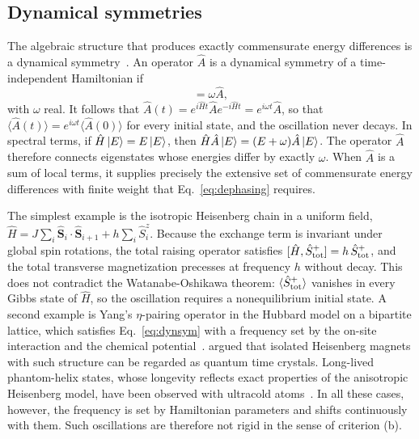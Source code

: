 \documentclass[%
reprint,
superscriptaddress,
amsmath,amssymb,
aps,
prb,
showkeys,%
floatfix,
]{revtex4-2}
\let\cite\citep   %
\begin{document}
	\subsection{\label{sec:dynsym}Dynamical symmetries}
	
	The algebraic structure that produces exactly commensurate energy differences is a dynamical symmetry~\cite{Buca2019NatCommun,Medenjak2020PRB}. An operator $\hat{A}$ is a dynamical symmetry of a time-independent Hamiltonian if
	\begin{equation}
		[\hat{H},\hat{A}]=\omega\hat{A},
		\label{eq:dynsym}
	\end{equation}
	with $\omega$ real. It follows that $\hat{A}(t)=e^{i\hat{H}t}\hat{A}e^{-i\hat{H}t}=e^{i\omega t}\hat{A}$, so that $\langle\hat{A}(t)\rangle=e^{i\omega t}\langle\hat{A}(0)\rangle$ for every initial state, and the oscillation never decays. In spectral terms, if $\hat{H}\ket{E}=E\ket{E}$, then $\hat{H}\hat{A}\ket{E}=(E+\omega)\hat{A}\ket{E}$. The operator $\hat{A}$ therefore connects eigenstates whose energies differ by exactly $\omega$. When $\hat{A}$ is a sum of local terms, it supplies precisely the extensive set of commensurate energy differences with finite weight that Eq.~\eqref{eq:dephasing} requires.
	
	The simplest example is the isotropic Heisenberg chain in a uniform field, $\hat{H}=J\sum_i\hat{\bm{S}}_i\cdot\hat{\bm{S}}_{i+1}+h\sum_i\hat{S}^z_i$. Because the exchange term is invariant under global spin rotations, the total raising operator satisfies $[\hat{H},\hat{S}^+_{\rm tot}]=h\,\hat{S}^+_{\rm tot}$, and the total transverse magnetization precesses at frequency $h$ without decay. This does not contradict the Watanabe-Oshikawa theorem: $\langle\hat{S}^+_{\rm tot}\rangle$ vanishes in every Gibbs state of $\hat{H}$, so the oscillation requires a nonequilibrium initial state. A second example is Yang's $\eta$-pairing operator in the Hubbard model on a bipartite lattice, which satisfies Eq.~\eqref{eq:dynsym} with a frequency set by the on-site interaction and the chemical potential~\cite{Yang1989}. \citet{Medenjak2020PRB} argued that isolated Heisenberg magnets with such structure can be regarded as quantum time crystals. Long-lived phantom-helix states, whose longevity reflects exact properties of the anisotropic Heisenberg model, have been observed with ultracold atoms~\cite{Jepsen2022}. In all these cases, however, the frequency is set by Hamiltonian parameters and shifts continuously with them. Such oscillations are therefore not rigid in the sense of criterion (b).
	
\end{document}
